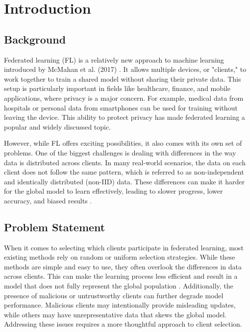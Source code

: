 \chapter{Introduction}

\section{Background}
Federated learning (FL) is a relatively new approach to machine learning introduced by McMahan et al. (2017) \cite{mcmahan2017communication}. It allows multiple devices, or "clients," to work together to train a shared model without sharing their private data. This setup is particularly important in fields like healthcare, finance, and mobile applications, where privacy is a major concern. For example, medical data from hospitals or personal data from smartphones can be used for training without leaving the device. This ability to protect privacy has made federated learning a popular and widely discussed topic.

However, while FL offers exciting possibilities, it also comes with its own set of problems. One of the biggest challenges is dealing with differences in the way data is distributed across clients. In many real-world scenarios, the data on each client does not follow the same pattern, which is referred to as non-independent and identically distributed (non-IID) data. These differences can make it harder for the global model to learn effectively, leading to slower progress, lower accuracy, and biased results \cite{kairouz2021advances}.

\section{Problem Statement}
When it comes to selecting which clients participate in federated learning, most existing methods rely on random or uniform selection strategies. While these methods are simple and easy to use, they often overlook the differences in data across clients. This can make the learning process less efficient and result in a model that does not fully represent the global population \cite{zhao2018federated}. Additionally, the presence of malicious or untrustworthy clients can further degrade model performance. Malicious clients may intentionally provide misleading updates, while others may have unrepresentative data that skews the global model. Addressing these issues requires a more thoughtful approach to client selection.

